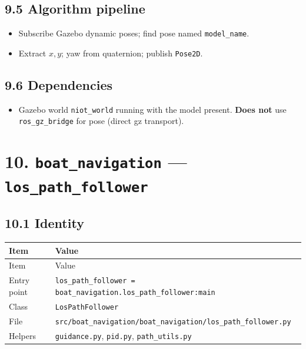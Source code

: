 \subsection{9.5 Algorithm pipeline}


\begin{itemize}[leftmargin=*]
\item Subscribe Gazebo dynamic poses; find pose named \texttt{model\_name}.
\item Extract \(x,y\); yaw from quaternion; publish \texttt{Pose2D}.
\end{itemize}


\subsection{9.6 Dependencies}


\begin{itemize}[leftmargin=*]
\item Gazebo world \texttt{niot\_world} running with the model present. \textbf{Does not} use \texttt{ros\_gz\_bridge} for pose (direct gz transport).
\end{itemize}




\section{10. \texttt{boat\_navigation} --- \texttt{los\_path\_follower}}


\subsection{10.1 Identity}


\begin{center}
\small
\begin{longtable}{@{}lp{10cm}@{}}
\toprule
Item & Value \\
\midrule
\endfirsthead
\toprule
Item & Value \\
\midrule
\endhead
Entry point & \texttt{los\_path\_follower = boat\_navigation.los\_path\_follower:main} \\
Class & \texttt{LosPathFollower} \\
File & \texttt{src/boat\_navigation/boat\_navigation/los\_path\_follower.py} \\
Helpers & \texttt{guidance.py}, \texttt{pid.py}, \texttt{path\_utils.py} \\
\bottomrule
\end{longtable}
\end{center}


